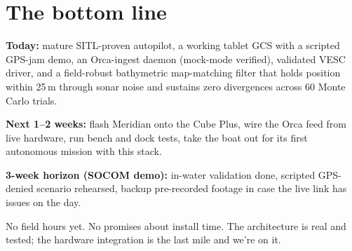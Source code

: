 \documentclass[10pt,a4paper]{article}
\begin{document}
\section{The bottom line}
\begin{tcolorbox}[colframe=mSafe, colback=white, title=\normalsize What you're signing up for]
\textbf{Today:} mature SITL-proven autopilot, a working tablet GCS with a
scripted GPS-jam demo, an Orca-ingest daemon (mock-mode verified),
validated VESC driver, and a field-robust bathymetric map-matching
filter that holds position within 25\,m through sonar noise and
sustains zero divergences across 60 Monte Carlo trials.

\textbf{Next 1--2 weeks:} flash Meridian onto the Cube Plus, wire the
Orca feed from live hardware, run bench and dock tests, take the boat
out for its first autonomous mission with this stack.

\textbf{3-week horizon (SOCOM demo):} in-water validation done, scripted
GPS-denied scenario rehearsed, backup pre-recorded footage in case the
live link has issues on the day.

No field hours yet. No promises about install time. The architecture is
real and tested; the hardware integration is the last mile and we're on it.
\end{tcolorbox}
\end{document}
